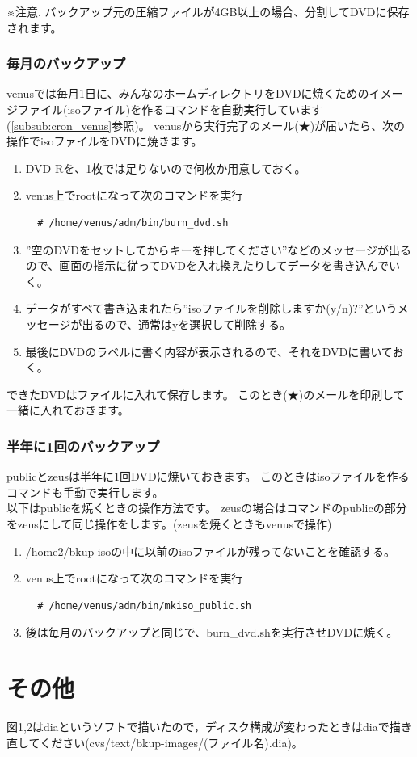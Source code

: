 \documentclass[11pt]{jarticle}
\begin{document}
※注意. バックアップ元の圧縮ファイルが4GB以上の場合、分割してDVDに保存されます。


\subsubsection{毎月のバックアップ \label{subsub:dvd_month}}

venusでは毎月1日に、みんなのホームディレクトリをDVDに焼くためのイメージファイル(isoファイル)を作るコマンドを自動実行しています(\ref{subsub:cron_venus}参照)。
venusから実行完了のメール(★)が届いたら、次の操作でisoファイルをDVDに焼きます。

\begin{enumerate}
\item DVD-Rを、1枚では足りないので何枚か用意しておく。
\item venus上でrootになって次のコマンドを実行
      \begin{verbatim}
  # /home/venus/adm/bin/burn_dvd.sh
      \end{verbatim}
\item ''空のDVDをセットしてからキーを押してください''などのメッセージが出るので、画面の指示に従ってDVDを入れ換えたりしてデータを書き込んでいく。
\item データがすべて書き込まれたら''isoファイルを削除しますか(y/n)?''というメッセージが出るので、通常はyを選択して削除する。
\item 最後にDVDのラベルに書く内容が表示されるので、それをDVDに書いておく。
\end{enumerate}

できたDVDはファイルに入れて保存します。
このとき(★)のメールを印刷して一緒に入れておきます。




\subsubsection{半年に1回のバックアップ}

publicとzeusは半年に1回DVDに焼いておきます。
このときはisoファイルを作るコマンドも手動で実行します。
\\

以下はpublicを焼くときの操作方法です。
zeusの場合はコマンドのpublicの部分をzeusにして同じ操作をします。(zeusを焼くときもvenusで操作)
\begin{enumerate}
\item /home2/bkup-isoの中に以前のisoファイルが残ってないことを確認する。
\item venus上でrootになって次のコマンドを実行
      \begin{verbatim}
  # /home/venus/adm/bin/mkiso_public.sh
      \end{verbatim}
\item 後は毎月のバックアップと同じで、burn\_dvd.shを実行させDVDに焼く。
\end{enumerate}



\section*{その他}

図1,2はdiaというソフトで描いたので，ディスク構成が変わったときはdiaで描き直してください(cvs/text/bkup-images/(ファイル名).dia)。
\end{document}
